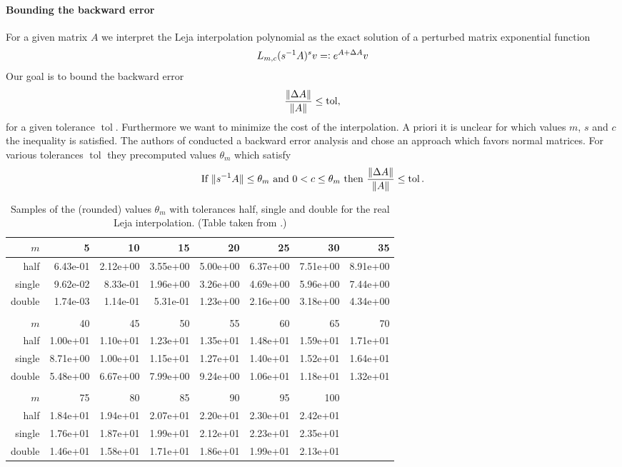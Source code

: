\documentclass{scrartcl}
\newcommand{\eqdefn}{=\mathrel{\mathop:}}
\begin{document}
\paragraph{Bounding the backward error} For a given matrix $A$ we interpret the Leja interpolation polynomial as the exact solution of a perturbed matrix exponential function
\[
L_{m,c}(s^{-1}A)^sv \eqdefn e^{A + \Delta A}v\\
\]
Our goal is to bound the backward error 
\[
\frac{\lVert\Delta A\rVert}{\lVert A\rVert} \le \operatorname{tol}, 
\]
for a given tolerance $\operatorname{tol}$. Furthermore we want to minimize the cost of the interpolation. A priori it is unclear for which values $m$, $s$ and $c$ the inequality is satisfied. The authors of \cite{lejarev} conducted a backward error analysis and chose an approach which favors normal matrices. For various tolerances $\operatorname{tol}$ they precomputed values $\theta_m$ which satisfy
\[
\text{If}\ \norm{s^{-1}A}\le \theta_m\ \text{and}\ 0 < c \le \theta_m\ \text{then}\ \frac{\norm{\Delta A}}{\norm{A}} \le \operatorname{tol}.
\]
\begin{table}[tbp]
	\begin{tabular}{r|rrrrrrr}
		$m$ &        5 &       10 &       15 &       20 &       25 &       30 &       35 \\\hline
		half & 6.43e-01 & 2.12e+00 & 3.55e+00 & 5.00e+00 & 6.37e+00 & 7.51e+00 & 8.91e+00 \\
		single & 9.62e-02 & 8.33e-01 & 1.96e+00 & 3.26e+00 & 4.69e+00 & 5.96e+00 & 7.44e+00 \\
		double & 1.74e-03 & 1.14e-01 & 5.31e-01 & 1.23e+00 & 2.16e+00 & 3.18e+00 & 4.34e+00 \\
		\\
		$m$ &       40 &       45 &       50 &       55 &       60 &       65 &       70 \\\hline
		half & 1.00e+01 & 1.10e+01 & 1.23e+01 & 1.35e+01 & 1.48e+01 & 1.59e+01 & 1.71e+01 \\
		single & 8.71e+00 & 1.00e+01 & 1.15e+01 & 1.27e+01 & 1.40e+01 & 1.52e+01 & 1.64e+01 \\
		double & 5.48e+00 & 6.67e+00 & 7.99e+00 & 9.24e+00 & 1.06e+01 & 1.18e+01 & 1.32e+01 \\
		\\
		$m$ &       75 &       80 &       85 &       90 &       95 &      100 \\ \hline
		half & 1.84e+01 & 1.94e+01 & 2.07e+01 & 2.20e+01 & 2.30e+01 & 2.42e+01 \\
		single & 1.76e+01 & 1.87e+01 & 1.99e+01 & 2.12e+01 & 2.23e+01 & 2.35e+01 \\
		double & 1.46e+01 & 1.58e+01 & 1.71e+01 & 1.86e+01 & 1.99e+01 & 2.13e+01
	\end{tabular}
	\caption{Samples of the (rounded) values $\theta_m$ with tolerances half, single and double for the real Leja interpolation. (Table taken from \cite[Table 1]{lejarev}.)}
	\label{table:thetam}
\end{table}	
\end{document}
